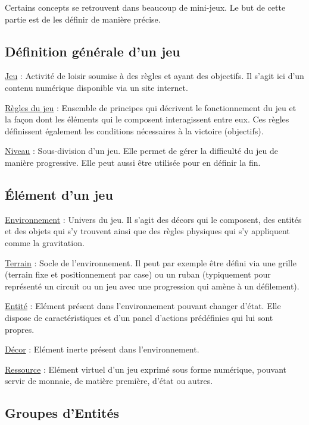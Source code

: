 Certains concepts se retrouvent dans beaucoup de mini-jeux. Le but de cette partie est de les définir de manière précise.

\subsection*{Définition générale d'un jeu}

\underline{Jeu} : 
Activité de loisir soumise à des règles et ayant des objectifs. Il s'agit ici d'un contenu numérique
 disponible via un site internet.

\underline{Règles du jeu} : 
Ensemble de principes qui décrivent le fonctionnement du jeu et 
la façon dont les éléments qui le composent interagissent entre eux. 
Ces règles définissent également les conditions nécessaires à la victoire (objectifs).

\underline{Niveau} :
Sous-division d'un jeu. Elle permet de gérer la difficulté du jeu de manière progressive. Elle peut aussi être utilisée pour en définir la fin. 

\subsection*{Élément d'un jeu}

\underline{Environnement} : 
Univers du jeu. Il s'agit des décors qui le composent, des entités et des objets qui s'y trouvent ainsi que 
des règles physiques qui s'y appliquent comme la gravitation.

\underline{Terrain} : 
Socle de l'environnement. Il peut par exemple être défini via une grille (terrain fixe et positionnement par case) ou un ruban
(typiquement pour représenté un circuit ou un jeu avec une progression qui amène à un défilement). 

\underline{Entité} : 
Elément présent dans l'environnement pouvant changer d'état. 
Elle dispose de caractéristiques et d'un panel d'actions prédéfinies qui lui sont propres.

\underline{Décor} : 
Elément inerte présent dans l'environnement.

\underline{Ressource} : 
Elément virtuel d'un jeu exprimé sous forme numérique, pouvant servir de monnaie, de matière première, d'état ou autres.

\subsection*{Groupes d'Entités}

